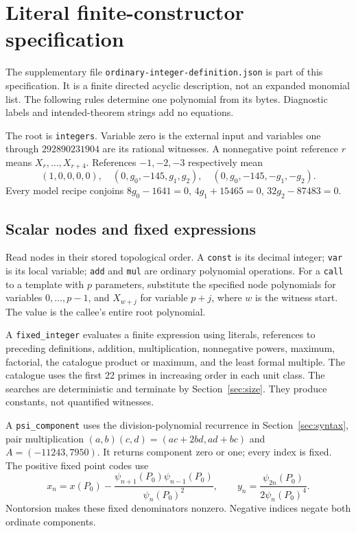 

\section{Literal finite-constructor specification}\label{app:literal}
The supplementary file \nolinkurl{ordinary-integer-definition.json}
is part of this specification. It is a finite directed acyclic description,
not an expanded monomial list. The following rules determine one polynomial
from its bytes. Diagnostic labels and intended-theorem strings add no equations.

The root is \texttt{integers}. Variable zero is the external input and
variables one through $292890231904$ are its rational witnesses.
A nonnegative point reference $r$ means $X_r,\ldots,X_{r+4}$.
References $-1,-2,-3$ respectively mean
\[
 (1,0,0,0,0),\quad(0,g_0,-145,g_1,g_2),\quad
                      (0,g_0,-145,-g_1,-g_2).
\]
Every model recipe conjoins
$8g_0-1641=0$, $4g_1+15465=0$, $32g_2-87483=0$.

\subsection{Scalar nodes and fixed expressions}
Read nodes in their stored topological order.
A \texttt{const} is its decimal integer; \texttt{var} is its local variable;
\texttt{add} and \texttt{mul} are ordinary polynomial operations.
For a \texttt{call} to a template with $p$ parameters, substitute the
specified node polynomials for variables $0,\ldots,p-1$, and $X_{w+j}$
for variable $p+j$, where $w$ is the witness start. The value is the
callee's entire root polynomial.

A \texttt{fixed\_integer} evaluates a finite expression using literals,
references to preceding definitions, addition, multiplication,
nonnegative powers, maximum, factorial, the catalogue product or maximum,
and the least formal multiple. The catalogue uses the first 22 primes
in increasing order in each unit class. The searches are deterministic
and terminate by Section~\ref{sec:size}. They produce constants, not
quantified witnesses.

A \texttt{psi\_component} uses the division-polynomial recurrence in
Section~\ref{sec:syntax}, pair multiplication
$(a,b)(c,d)=(ac+2bd,ad+bc)$ and $A=(-11243,7950)$.
It returns component zero or one; every index is fixed.
The positive fixed point codes use
\[
 x_n=x(P_0)-\frac{\psi_{n+1}(P_0)\psi_{n-1}(P_0)}{\psi_n(P_0)^2},
 \qquad y_n=\frac{\psi_{2n}(P_0)}{2\psi_n(P_0)^4}.
\]
Nontorsion makes these fixed denominators nonzero.
Negative indices negate both ordinate components.

